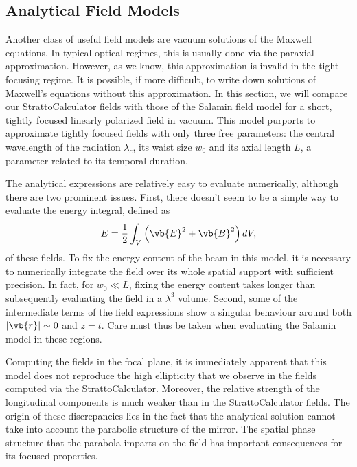 \documentclass[11pt,SymmetricalJury]{inrsthesis/inrsthesis}
\begin{document}
\subsection{Analytical Field Models}

Another class of useful field models are vacuum solutions of the Maxwell
equations. In typical optical regimes, this is usually done via the paraxial
approximation. However, as we know, this approximation is invalid in the tight
focusing regime. It is possible, if more difficult, to write down solutions of
Maxwell's equations without this approximation. In this section, we will compare
our StrattoCalculator fields with those of the Salamin field model
\cite{Salamin2015b} for a short, tightly focused linearly polarized field in
vacuum. This model purports to approximate tightly focused fields with only
three free parameters: the central wavelength of the radiation $\lambda_c$, its
waist size $w_0$ and its axial length $L$, a parameter related to its temporal
duration.

The analytical expressions are relatively easy to evaluate numerically, although
there are two prominent issues. First, there doesn't seem to be a simple way to
evaluate the energy integral, defined as
  \begin{equation}
    E = \frac{1}{2}\int_V \left(\vb{E}^2+\vb{B}^2\right) dV,
  \end{equation}
of these fields. To fix the energy content of the beam in this model, it is
necessary to numerically integrate the field over its whole spatial support with
sufficient precision. In fact, for $w_0\ll L$, fixing the energy content takes
longer than subsequently evaluating the field in a $\lambda^3$ volume. Second,
some of the intermediate terms of the field expressions show a singular
behaviour around both $|\vb{r}|\sim0$ and $z=t$. Care must thus be taken when
evaluating the Salamin model in these regions.

Computing the fields in the focal plane, it is immediately apparent that this
model does not reproduce the high ellipticity that we observe in the fields
computed via the StrattoCalculator. Moreover, the relative strength of the
longitudinal components is much weaker than in the StrattoCalculator fields. The
origin of these discrepancies lies in the fact that the analytical solution
cannot take into account the parabolic structure of the mirror. The spatial
phase structure that the parabola imparts on the field has important
consequences for its focused properties.
\end{document}
